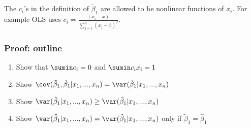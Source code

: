 The $c_i$'s in the definition of $\tilde{\beta}_1$ are allowed to be
nonlinear functions of $x_i$. For example OLS uses $c_i = \frac{(x_i -
  \bar{x})}{\sum_{j=1}^n (x_j - \bar{x})^2}$. 

\begin{frame}\frametitle{Proof: outline}
  \begin{enumerate}
  \item Show that $\sumin c_i = 0$ and $\sumin c_i x_i = 1$
  \item Show $\cov(\tilde{\beta}_1, \hat{\beta}_1|x_1,...,x_n) =
    \var(\hat{\beta}_1|x_1, ..., x_n)$
  \item Show $\var(\tilde{\beta}_1 | x_1, ..., x_n) \geq
    \var(\hat{\beta}_1 | x_1, ..., x_n)$
  \item Show $\var(\tilde{\beta}_1 | x_1, ..., x_n) =
    \var(\hat{\beta}_1 | x_1, ..., x_n)$ only if $\tilde{\beta}_1 =
    \hat{\beta}_1$ 
  \end{enumerate}
\end{frame}

